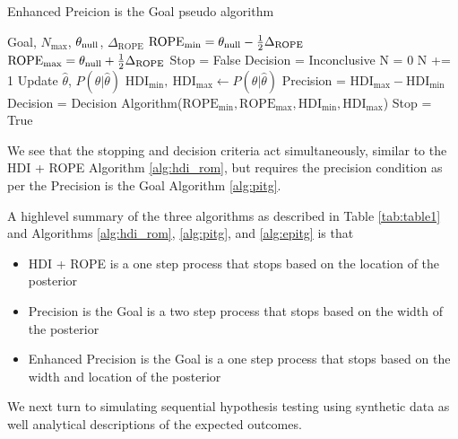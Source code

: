 \begin{algorithm}
    \caption{Enhanced Preicion is the Goal pseudo algorithm}\label{alg:epitg}
    \begin{algorithmic}
    \Require Goal, $N_\mathrm{max}$, $\theta_{\rm null}$, $\Delta_\mathrm{ROPE}$
    \State $\mathrm{ROPE}_\mathrm{min} = \theta_{\rm null} - \frac{1}{2}\Delta_\mathrm{ROPE}$
    \State $\mathrm{ROPE}_\mathrm{max} = \theta_{\rm null} + \frac{1}{2}\Delta_\mathrm{ROPE}$
    \State Stop = False
    \State Decision = Inconclusive
    \State N = 0
    \State N += 1  
    \State Update $\hat\theta$, $P(\theta|\hat\theta)$  
    \State $\mathrm{HDI}_\mathrm{min}, \ \mathrm{HDI}_\mathrm{max}  \gets P(\theta|\hat\theta)$ 
    \State Precision = $\mathrm{HDI}_\mathrm{max} - \mathrm{HDI}_\mathrm{min}$
        \State Decision = Decision Algorithm($\mathrm{ROPE}_\mathrm{min}, \mathrm{ROPE}_\mathrm{max}, \mathrm{HDI}_\mathrm{min}, \mathrm{HDI}_\mathrm{max}$) 
            \State \HiLi Stop = True 
        \EndIf
    \EndIf
    \EndWhile
    \end{algorithmic}
\end{algorithm}

We see that the stopping and decision criteria act simultaneously, similar to the HDI + ROPE Algorithm \ref{alg:hdi_rom},
but requires the precision condition as per the Precision is the Goal Algorithm \ref{alg:pitg}.

A highlevel summary of the three algorithms as described in Table \ref{tab:table1}
and Algorithms \ref{alg:hdi_rom}, \ref{alg:pitg}, and \ref{alg:epitg} is that

\begin{itemize}
    \item HDI + ROPE is a one step process that stops based on the location of the posterior
    \item Precision is the Goal is a two step process that stops based on the width of the posterior
    \item Enhanced Precision is the Goal is a one step process that stops based on the width and location of the posterior
\end{itemize}

We next turn to simulating sequential hypothesis testing using synthetic data as well
analytical descriptions of the expected outcomes.
